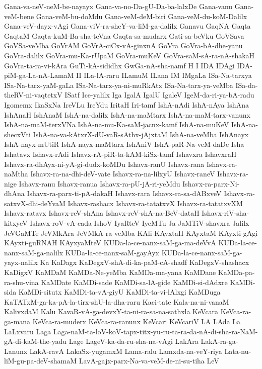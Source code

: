 {Gana-va-neV-neM-be-nayayx
Gana-va-no-Da-gU-Da-ba-lalxDe
Gana-vanu
Gana-veM-bene
Gana-veM-bu-doMdu
Gana-veM-deM-biri
Gana-veM-du-koM-Dalilx
Gana-veV-dayx-vAgi
Gana-viV-ra-sheY-va-liM-ga-dalilx
Ganavu
GaqNA
Gaqta
GaqtaM
Gaqta-kuM-Ba-sha-teVna
Gaqta-sa-mudarx
Gati-sa-beVku
GoVSava
GoVSa-veMba
GoVrAM
GoVrA-ciCx-vA-ginxnA
GoVra
GoVra-bA-dhe-yanu
GoVra-dalilx
GoVra-mu-Ka-rUpaM
GoVra-muKeV
GoVra-saM-sA-ra-nA-shakaH
GoVra-ta-ra-vi-kAra
GuTi-kA-sididhx
GwGa-nA-sha-namf
H
I
IDA
IDAgi
IDA-piM-ga-La-nA-LamaM
II
ILa-lA-raru
ILamuM
ILana
IM
IMgaLa
ISa-Na-tarxya
ISa-Na-tarx-yaM-gaLa
ISa-Na-tarx-ya-ni-muRkAtx
ISa-Na-tarx-ya-veMba
ISa-da-theRV-ni-vaqtetxV
ISatf
Ice-yalilx
Iga
IgalA
IgalU
IgaleV
IgeM-da-ri-ya-bA-radu
Igomemx
IkaSxNa
IreVLu
IreYdu
IritaH
Iri-tamf
IshA-nAdi
IshA-nAya
IshAna
IshAnaH
IshAnaM
IshA-na-dalilx
IshA-na-maMtarx
IshA-na-maM-tarx-vanunx
IshA-na-maM-terxVNa
IshA-na-mu-Ka-saM-jacnx-kamf
IshA-na-muKeV
IshA-na-shecxVti
IshA-na-va-kAtxrX-dU-vaR-sAthx-jAjxtaM
IshA-na-veMba
IshAnayx
IshA-nayx-mUtiR
IshA-nayx-maMtarx
IshAniV
IshA-paR-Na-veM-daDe
Isha
Ishatavx
Ishavx-rAdi
Ishavx-rA-piR-ta-kAM-kiSx-tamf
Ishavxra
IshavxraH
Ishavx-ra-dhAyx-ni-yA-gi-dudx-koMDu
Ishavx-ranU
Ishavx-rana
Ishavx-ra-naMtha
Ishavx-ra-na-dhi-deV-vate
Ishavx-ra-na-lilxyU
Ishavx-raneV
Ishavx-ra-nige
Ishavx-ranu
Ishavx-ranua
Ishavx-ra-pU-jA-ri-yeMdu
Ishavx-ra-parx-Ni-dhAna
Ishavx-ra-parx-ti-pA-dakaH
Ishavx-rara
Ishavx-ra-sa-dABxveV
Ishavx-ra-satxvX-dhi-deYvaM
Ishavx-rashacx
Ishavx-ra-tatatxvX
Ishavx-ra-tatatxvXM
Ishavx-ratavx
Ishavx-reV-shAna
Ishavx-reV-shA-na-BeV-dataH
Ishavx-riV-sha-kitxyeV
Ishavx-roV-vA-cada
IshoV
IyaRteV
IyeMTu
Ja
JaMTiV-shavxra
Jalilx
JeVGaMTe
JeVMkAra
JeVMkA-ra-veMba
KAli
KAyxtaH
KAyxtaM
KAyxti-gAgi
KAyxti-guRNAH
KAyxyaMteV
KUDa-la-ce-nanx-saM-ga-ma-deVvA
KUDa-la-ce-nanx-saM-ga-nalilx
KUDa-la-ce-nanx-saM-gayAyx
KUDa-la-ce-nanx-saM-ga-yayx-nalilx
Ka
KaDagx
KaDegxV-shA-di-ka-paM-cA-shadf
KaDegxV-shashacx
KaDigxV
KaMDaM
KaMDa-Ne-yeMba
KaMDa-ma-yana
KaMDane
KaMDa-pa-ra-shu-vina
KaMDate
KaMDi-sade
KaMDi-sa-lA-gide
KaMDi-si-dAdxre
KaMDi-sida
KaMDi-situtx
KaMDi-ta-vA-giyU
KaMDi-ta-vi-lAlxgi
KaMDuga
KaTATxM-ga-ka-pA-la-tirx-shU-la-dha-raru
Kaci-tate
Kala-na-ni-vanaM
KalivxdaM
Kalu
KavaR-vA-ga-devxY-ta-ni-ra-sa-na-sathxla
KeVcara
KeVca-ra-ga-mana
KeVca-ra-muderx
KeVca-ra-ranunx
KeVcari
KeVcariV
LA
LAda
La
LaLxvaru
Laga
Laga-naM-ta-loV-koV-tapx-titx-yu-ru-ta-ra-da-nA-di-sha-ra-NaM-gA-di-kaM-the-yadu
Lage
LageV-ka-da-ru-sha-na-vAgi
LakAra
LakA-ra-ga-Lanunx
LakA-ravA
LakaSx-yugamxM
Lama-ralu
Lamxda-na-veY-riya
Lata-nu-liM-gu-pa-deV-shamaM
LavA-gajx-parx-Na-va-veM-de-ni-su-tiha
LeV
}
